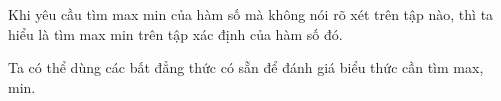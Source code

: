 \begin{note}
	\begin{listEX}[1]
		\item [\ding{172}] Khi yêu cầu tìm max min của hàm số mà không nói rõ xét trên tập nào, thì ta hiểu là tìm max min trên tập xác định của hàm số đó.
	\item [\ding{173}] Ta có thể dùng các bất đẳng thức có sẵn để đánh giá biểu thức cần tìm max, min. 
	\end{listEX}
\end{note}
